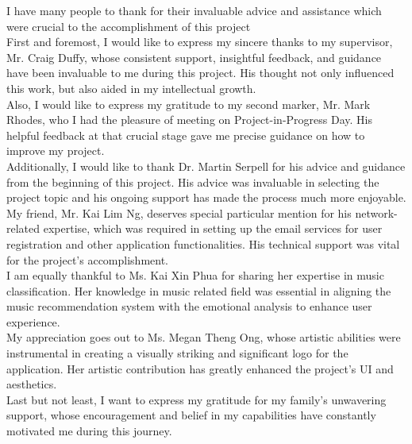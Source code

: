 I have many people to thank for their invaluable advice and assistance which were crucial to the accomplishment of this project
\\
\indent First and foremost, I would like to express my sincere thanks to my supervisor, Mr. Craig Duffy, whose consistent support, insightful feedback, and guidance have been invaluable to me during this project.
His thought not only influenced this work, but also aided in my intellectual growth.
\\
\indent Also, I would like to express my gratitude to my second marker, Mr. Mark Rhodes, who I had the pleasure of meeting on Project-in-Progress Day.
His helpful feedback at that crucial stage gave me precise guidance on how to improve my project.
\\
\indent Additionally, I would like to thank Dr. Martin Serpell for his advice and guidance from the beginning of this project.
His advice was invaluable in selecting the project topic and his ongoing support has made the process much more enjoyable.
\\
\indent My friend, Mr. Kai Lim Ng, deserves special particular mention for his network-related expertise, which was required in setting up the email services for user registration and other application functionalities.
His technical support was vital for the project's accomplishment.
\\
\indent I am equally thankful to Ms. Kai Xin Phua for sharing her expertise in music classification. 
Her knowledge in music related field was essential in aligning the music recommendation system with the emotional analysis to enhance user experience.
\\
\indent My appreciation goes out to Ms. Megan Theng Ong, whose artistic abilities were instrumental in creating a visually striking and significant logo for the application. 
Her artistic contribution has greatly enhanced the project's UI and aesthetics.
\\
\indent Last but not least, I want to express my gratitude for my family's unwavering support, whose encouragement and belief in my capabilities have constantly motivated me during this journey.
 